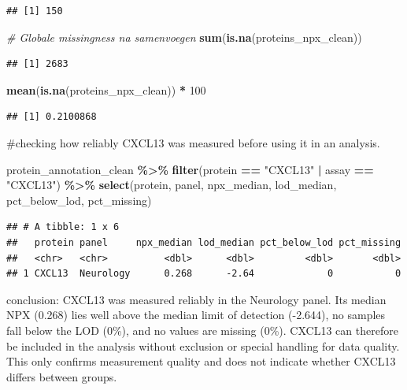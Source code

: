\documentclass[
]{article}
\newenvironment{Shaded}{\begin{snugshade}}{\end{snugshade}}
\newcommand{\CommentTok}[1]{\textcolor[rgb]{0.56,0.35,0.01}{\textit{#1}}}
\newcommand{\DecValTok}[1]{\textcolor[rgb]{0.00,0.00,0.81}{#1}}
\newcommand{\FunctionTok}[1]{\textcolor[rgb]{0.13,0.29,0.53}{\textbf{#1}}}
\newcommand{\NormalTok}[1]{#1}
\newcommand{\SpecialCharTok}[1]{\textcolor[rgb]{0.81,0.36,0.00}{\textbf{#1}}}
\newcommand{\StringTok}[1]{\textcolor[rgb]{0.31,0.60,0.02}{#1}}
\begin{document}
\begin{verbatim}
## [1] 150
\end{verbatim}

\begin{Shaded}
\begin{Highlighting}[]
\CommentTok{\# Globale missingness na samenvoegen}
\FunctionTok{sum}\NormalTok{(}\FunctionTok{is.na}\NormalTok{(proteins\_npx\_clean))}
\end{Highlighting}
\end{Shaded}

\begin{verbatim}
## [1] 2683
\end{verbatim}

\begin{Shaded}
\begin{Highlighting}[]
\FunctionTok{mean}\NormalTok{(}\FunctionTok{is.na}\NormalTok{(proteins\_npx\_clean)) }\SpecialCharTok{*} \DecValTok{100}
\end{Highlighting}
\end{Shaded}

\begin{verbatim}
## [1] 0.2100868
\end{verbatim}

\#checking how reliably CXCL13 was measured before using it in an
analysis.

\begin{Shaded}
\begin{Highlighting}[]
\NormalTok{protein\_annotation\_clean }\SpecialCharTok{\%\textgreater{}\%}
  \FunctionTok{filter}\NormalTok{(protein }\SpecialCharTok{==} \StringTok{"CXCL13"} \SpecialCharTok{|}\NormalTok{ assay }\SpecialCharTok{==} \StringTok{"CXCL13"}\NormalTok{) }\SpecialCharTok{\%\textgreater{}\%}
  \FunctionTok{select}\NormalTok{(protein, panel, npx\_median, lod\_median, pct\_below\_lod, pct\_missing)}
\end{Highlighting}
\end{Shaded}

\begin{verbatim}
## # A tibble: 1 x 6
##   protein panel     npx_median lod_median pct_below_lod pct_missing
##   <chr>   <chr>          <dbl>      <dbl>         <dbl>       <dbl>
## 1 CXCL13  Neurology      0.268      -2.64             0           0
\end{verbatim}

conclusion: CXCL13 was measured reliably in the Neurology panel. Its
median NPX (0.268) lies well above the median limit of detection
(-2.644), no samples fall below the LOD (0\%), and no values are missing
(0\%). CXCL13 can therefore be included in the analysis without
exclusion or special handling for data quality. This only confirms
measurement quality and does not indicate whether CXCL13 differs between
groups.
\end{document}
